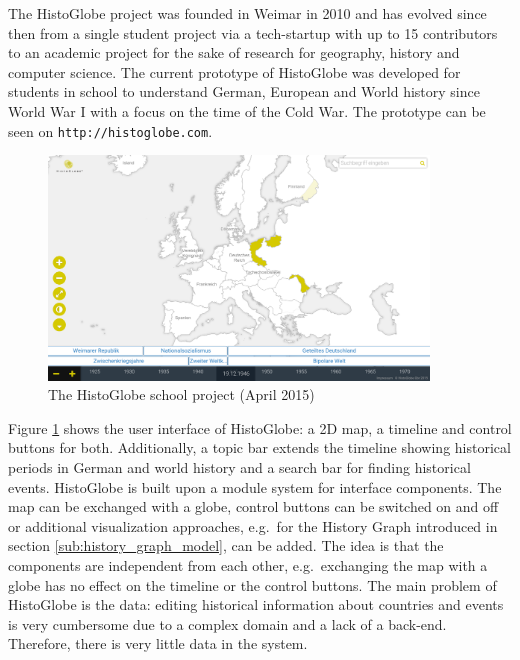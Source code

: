 The HistoGlobe project was founded in Weimar in 2010 and has evolved since then from a single student project via a tech-startup with up to 15 contributors to an academic project for the sake of research for geography, history and computer science. The current prototype of HistoGlobe was developed for students in school to understand German, European and World history since World War I with a focus on the time of the Cold War. The prototype can be seen on \texttt{http://histoglobe.com}.

\begin{figure}[ht]
  \vspace{1em}
  \centering
  \includegraphics[width=0.9\textwidth]{graphics/basics/histoglobe/school_project}
  \caption{The HistoGlobe school project (April 2015)}
  \label{fig:histoglobe_school}
\end{figure}

\newpage
Figure \ref{fig:histoglobe_school} shows the user interface of HistoGlobe: a 2D map, a timeline and control buttons for both. Additionally, a topic bar extends the timeline showing historical periods in German and world history and a search bar for finding historical events. HistoGlobe is built upon a module system for interface components. The map can be exchanged with a globe, control buttons can be switched on and off or additional visualization approaches, e.g.\ for the History Graph introduced in section \ref{sub:history_graph_model}, can be added. The idea is that the components are independent from each other, e.g.\ exchanging the map with a globe has no effect on the timeline or the control buttons. The main problem of HistoGlobe is the data: editing historical information about countries and events is very cumbersome due to a complex domain and a lack of a back-end. Therefore, there is very little data in the system.


